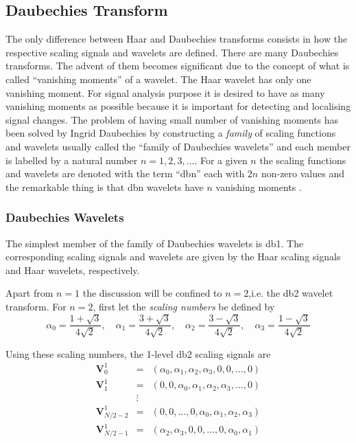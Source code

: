 \documentclass[a4paper,11pt]{article}
\begin{document}
\subsection{Daubechies Transform}
The only difference between Haar and Daubechies transforms consists in how the respective scaling signals and wavelets are defined. There are many Daubechies transforms. The advent of them becomes significant due to the concept of what is called ``vanishing moments'' of a wavelet.
The Haar wavelet has only one vanishing moment. For signal analysis purpose it is desired to have as many vanishing moments as possible because it is important for detecting and localising signal changes. The problem of having small number of vanishing moments has been solved by Ingrid Daubechies by constructing a \emph{family} of scaling functions and wavelets usually called the ``family of Daubechies wavelets'' and each member is labelled by a natural number $n=1,2,3,\ldots$. For a given $n$ the scaling functions and wavelets are denoted with the term ``dbn'' each with $2n$ non-zero values and the remarkable thing is that dbn wavelets have $n$ vanishing moments \cite{stark}.

\subsubsection{Daubechies Wavelets}
The simplest member of the family of Daubechies wavelets is db1. The corresponding scaling signals and wavelets are given by the Haar scaling signals and Haar wavelets, respectively.

Apart from $n=1$ the discussion will be confined to $n=2$,i.e. the db2 wavelet transform. For $n=2$, first let the \emph{scaling numbers} be defined by
\begin{equation}
\alpha_{0}=\frac{1+\sqrt{3}}{4\sqrt{2}}, \quad \alpha_{1}=\frac{3+\sqrt{3}}{4\sqrt{2}}, \quad \alpha_{2}=\frac{3-\sqrt{3}}{4\sqrt{2}}, \quad \alpha_{3}=\frac{1-\sqrt{3}}{4\sqrt{2}}
\end{equation}

Using these scaling numbers, the 1-level db2 scaling signals are
\begin{eqnarray}
\mathbf{V}_{0}^{1} & = & ( \alpha_{0},\alpha_{1},\alpha_{2},\alpha_{3},0,0,\ldots,0 ) \nonumber \\
\mathbf{V}_{1}^{1} & = & ( 0,0,\alpha_{0},\alpha_{1},\alpha_{2},\alpha_{3},\ldots,0 ) \nonumber \\
	 & \vdots & 	\nonumber \\
\mathbf{V}_{N/2-2}^{1} & = & ( 0,0,\ldots,0,\alpha_{0},\alpha_{1},\alpha_{2},\alpha_{3} ) \nonumber \\ 
\mathbf{V}_{N/2-1}^{1} & = & ( \alpha_{2},\alpha_{3},0,0,\ldots,0,\alpha_{0},\alpha_{1} )  
\end{eqnarray}
\end{document}
